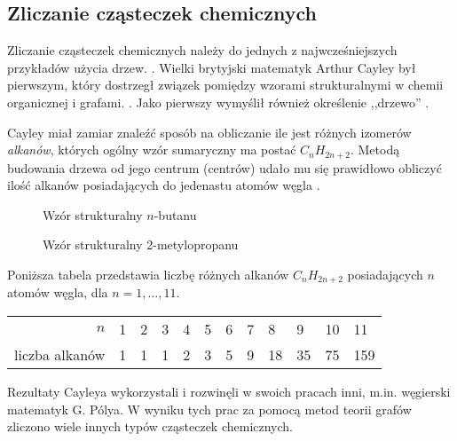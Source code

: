 \subsection*{Zliczanie cząsteczek chemicznych}

Zliczanie cząsteczek chemicznych należy do jednych z najwcześniejszych przykładów użycia drzew. \cite[76]{wilson}. Wielki brytyjski matematyk Arthur Cayley był pierwszym, który dostrzegł związek pomiędzy wzorami strukturalnymi w chemii organicznej i grafami. \cite[59]{gutman}. Jako pierwszy wymyślił również określenie ,,drzewo'' \cite[60]{gutman}.

Cayley miał zamiar znaleźć sposób na obliczanie ile jest różnych izomerów \emph{alkanów}, których ogólny wzór sumaryczny ma postać $C_nH_{2n+2}$. Metodą budowania drzewa od jego centrum (centrów) udało mu się prawidłowo obliczyć ilość alkanów posiadających do jedenastu atomów węgla \cite[180]{aldous}. 

\begin{figure}[H]
\centering
\begin{minipage}[b]{.45\textwidth}
  \centering
{}
\captionsetup{justification=centering}
\caption{Wzór strukturalny $n$-butanu}
\label{fig:bridges-of-konigsberg}
\end{minipage}
\begin{minipage}[b]{.45\textwidth}
  \centering
{}
\captionsetup{justification=centering}
\caption{Wzór strukturalny 2-metylopropanu}
\end{minipage}
\end{figure}

Poniższa tabela przedstawia liczbę różnych alkanów $C_nH_{2n+2}$ posiadających $n$ atomów węgla, dla $n=1,\ldots,11$.

\begin{table}[h]
\begin{tabularx}{\textwidth}{rXXXXXXXXXXX}
\toprule
  $n$ & 1 & 2 & 3 & 4 & 5 & 6 & 7 & 8 & 9 & 10 & 11 \\ 
 liczba alkanów & 1 & 1 & 1 & 2 & 3 & 5 & 9 & 18 & 35 & 75 & 159 \\
 \bottomrule
\end{tabularx}
\end{table}

Rezultaty Cayleya wykorzystali i rozwinęli w swoich pracach inni, m.in. węgierski matematyk G. Pólya. W wyniku tych prac za pomocą metod teorii grafów zliczono wiele innych typów cząsteczek chemicznych.


